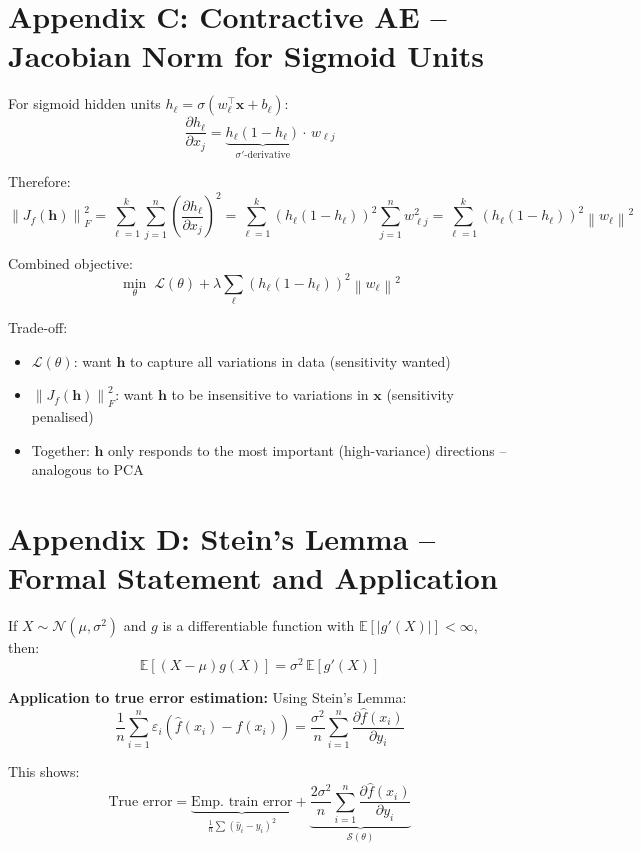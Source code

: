 \documentclass[12pt,a4paper]{article}
\newcommand{\E}{\mathbb{E}}
\newcommand{\norm}[1]{\left\|#1\right\|}
\newcommand{\vx}{\mathbf{x}}
\newcommand{\vh}{\mathbf{h}}
\newcommand{\Loss}{\mathcal{L}}
\newcommand{\Reg}{\mathcal{S}}
\begin{document}
\section{Appendix C: Contractive AE -- Jacobian Norm for Sigmoid Units}

For sigmoid hidden units $h_\ell = \sigma(w_\ell^\top\vx + b_\ell)$:
\[
\frac{\partial h_\ell}{\partial x_j}
= \underbrace{h_\ell(1-h_\ell)}_{\sigma'\text{-derivative}}
  \cdot\, w_{\ell j}
\]

Therefore:
\[
\norm{J_f(\vh)}_F^2
= \sum_{\ell=1}^{k}\sum_{j=1}^{n}
  \left(\frac{\partial h_\ell}{\partial x_j}\right)^2
= \sum_{\ell=1}^{k}(h_\ell(1-h_\ell))^2\sum_{j=1}^{n}w_{\ell j}^2
= \sum_{\ell=1}^{k}(h_\ell(1-h_\ell))^2\norm{w_\ell}^2
\]

Combined objective:
\[
\min_\theta\;\Loss(\theta) + \lambda\sum_\ell(h_\ell(1-h_\ell))^2\norm{w_\ell}^2
\]

Trade-off:
\begin{itemize}
  \item $\Loss(\theta)$: want $\vh$ to capture all variations in data (sensitivity wanted)
  \item $\norm{J_f(\vh)}_F^2$: want $\vh$ to be insensitive to variations in $\vx$ (sensitivity penalised)
  \item Together: $\vh$ only responds to the most important (high-variance) directions -- analogous to PCA
\end{itemize}

\section{Appendix D: Stein's Lemma -- Formal Statement and Application}

\begin{thmbox}[title={Stein's Lemma (Formal)}]
If $X \sim \mathcal{N}(\mu, \sigma^2)$ and $g$ is a differentiable function with $\E[|g'(X)|] < \infty$, then:
\[
\E[(X-\mu)g(X)] = \sigma^2\,\E[g'(X)]
\]
\end{thmbox}

\textbf{Application to true error estimation:} Using Stein's Lemma:
\[
\frac{1}{n}\sum_{i=1}^{n}\varepsilon_i(\hat{f}(x_i) - f(x_i))
= \frac{\sigma^2}{n}\sum_{i=1}^{n}\frac{\partial\hat{f}(x_i)}{\partial y_i}
\]

This shows:
\[
\text{True error}
= \underbrace{\text{Emp.\ train error}}_{\frac{1}{n}\sum(\hat{y}_i-y_i)^2}
+ \underbrace{\frac{2\sigma^2}{n}\sum_{i=1}^{n}\frac{\partial\hat{f}(x_i)}{\partial y_i}}_{\Reg(\theta)}
\]
\end{document}
